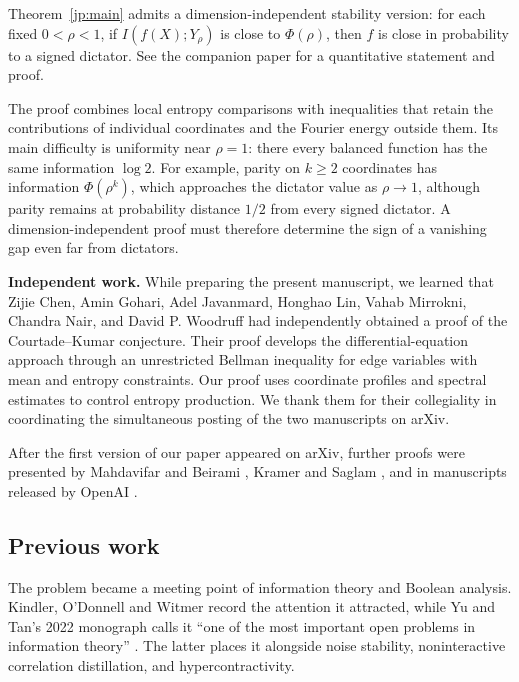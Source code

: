 \documentclass[11pt,letterpaper]{amsart}
\newcommand{\1}{\mathbf 1}
\numberwithin{equation}{section}
\begin{document}
Theorem~\ref{jp:main} admits a dimension-independent stability version:
for each fixed $0<\rho<1$, if $I(f(X);Y_\rho)$ is close to $\Phi(\rho)$,
then $f$ is close in probability to a signed dictator.
See the companion paper \cite[Theorem~1.1]{VuTranStability}
for a quantitative statement and proof.

The proof combines local entropy comparisons with inequalities that
retain the contributions of individual coordinates and the Fourier
energy outside them. Its main difficulty is uniformity near $\rho=1$:
there every balanced function has the same information $\log2$.
For example, parity on $k\ge2$ coordinates has information
$\Phi(\rho^k)$, which approaches the dictator value as $\rho\to1$,
although parity remains at probability distance $1/2$ from every
signed dictator. A dimension-independent proof must therefore determine
the sign of a vanishing gap even far from dictators.

\medskip
\noindent\textbf{Independent work.}
While preparing the present manuscript, we learned that Zijie Chen,
Amin Gohari, Adel Javanmard, Honghao Lin, Vahab Mirrokni, Chandra Nair,
and David P. Woodruff \cite{CGJLMNW2026} had independently obtained a
proof of the Courtade--Kumar conjecture. Their proof develops the
differential-equation approach through an unrestricted Bellman
inequality for edge variables with mean and entropy constraints.
Our proof uses coordinate profiles and spectral estimates to control
entropy production. We thank them for their collegiality in coordinating
the simultaneous posting of the two manuscripts on arXiv.

After the first version of our paper appeared on arXiv, further proofs were presented by Mahdavifar and Beirami \cite{MahdavifarBeirami2026}, Kramer and Saglam
\cite{KramerSaglam2026}, and in manuscripts released by OpenAI \cite{OpenAI2026Information,OpenAI2026Hellinger}.

\subsection{Previous work}
The problem became a meeting point of information theory and Boolean
analysis. Kindler, O'Donnell and Witmer
\cite{KindlerODonnellWitmer2015} record the attention it attracted,
while Yu and Tan's 2022 monograph calls it “one of the most important
open problems in information theory” \cite[Section~9.1.2]{YuTan2022}.
The latter places it alongside noise stability, noninteractive
correlation distillation, and hypercontractivity.
\end{document}

